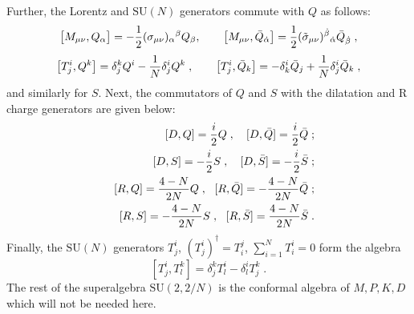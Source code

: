 \documentclass[a4paper,12pt]{article}
\begin{document}
Further, the Lorentz and $\mbox{SU}(N)$ generators commute with 
$Q$ as follows: 
\begin{equation}\label{1}
\big[M_{\mu\nu},Q_\alpha\big] = -{1\over 
2}(\sigma_{\mu\nu})_\alpha{}^\beta Q_\beta, \qquad 
\big[M_{\mu\nu},\bar Q_{\dot\alpha}\big] = {1\over 
2}(\tilde\sigma_{\mu\nu})^{\dot\beta}{}_{\dot\alpha} \bar 
Q_{\dot\beta}\;, 
\end{equation}
\begin{equation}\label{2}
  \big[T^i_j, Q^k\big] = \delta^k_j Q^i - {1\over N}\delta^i_j Q^k \; , 
\qquad \big[T^i_j, \bar Q_k\big] = -\delta^i_k \bar Q_j + {1\over 
N}\delta^i_j \bar Q_k \;, 
\end{equation}
and similarly for $S$. Next, the commutators of $Q$ and $S$ with 
the dilatation and R charge generators are given below:
\begin{eqnarray}
  &&[D,Q] = {i\over 2}Q\; ,\ \ \ [D,\bar Q]={i\over 2}\bar Q\;; \nonumber\\
  && [D,S]=-{i\over 2}S\; , \ \ \ [D,\bar S]=-{i\over 2}\bar S\;; 
\label{3}\\
  &&[R,Q] = {4-N\over 2N}Q\; ,\ \ [R,\bar Q]= -{4-N\over 2N}\bar
Q\;;  \nonumber\\
  && [R,S]=-{4-N\over 2N}S\; , \ \ [R,\bar S]={4-N\over 2N}\bar 
S\;. \label{4} 
\end{eqnarray}
Finally, the $\mbox{SU}(N)$ generators $T^i_j$, $(T^i_j)^\dagger = 
T^j_i$, $\sum_{i=1}^NT^i_i=0$ form the algebra
\begin{equation}\label{5}
 [T^i_j, T^k_l] = \delta^k_j T^i_l - \delta^i_l T^k_j\; .
\end{equation}
The rest of the superalgebra $\mbox{SU}(2,2/N)$ is the  conformal 
algebra of $M,P,K,D$ which will not be needed here. 
\end{document}
